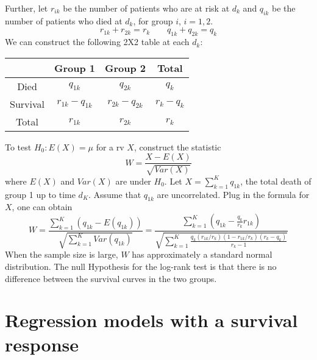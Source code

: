 \documentclass[
  letterpaper,
  DIV=11,
  numbers=noendperiod]{scrreprt}
\begin{document}
Further, let \(r_{ik}\) be the number of patients who are at risk at
\(d_k\) and \(q_{ik}\) be the number of patients who died at \(d_k\),
for group \(i\), \(i=1,2\).
\[r_{1k}+r_{2k} =r_k \qquad q_{1k}+q_{2k}=q_k \] We can construct the
following 2X2 table at each \(d_k\):

\begin{longtable}[]{@{}cccc@{}}
\toprule\noalign{}
& Group 1 & Group 2 & Total \\
\midrule\noalign{}
\endhead
\bottomrule\noalign{}
\endlastfoot
Died & \(q_{1k}\) & \(q_{2k}\) & \(q_k\) \\
Survival & \(r_{1k}-q_{1k}\) & \(r_{2k} -q_{2k}\) & \(r_k-q_k\) \\
Total & \(r_{1k}\) & \(r_{2k}\) & \(r_k\) \\
\end{longtable}

To test \(H_0: E(X)=\mu\) for a rv \(X\), construct the statistic \[ 
W = \frac{X-E(X)}{\sqrt{Var(X)}}
\] where \(E(X)\) and \(Var(X)\) are under \(H_0\). Let
\(X=\sum_{k=1}^K q_{1k}\), the total death of group 1 up to time
\(d_K\). Assume that \(q_{1k}\) are uncorrelated. Plug in the formula
for \(X\), one can obtain \[
W=\frac{\sum_{k=1}^K(q_{1k}-E(q_{1k}))}{\sqrt{\sum_{k=1}^K Var(q_{1k})}} = \frac{\sum_{k=1}^K(q_{1k}- \frac{q_k}{r_k}r_{1k})}{\sqrt{\sum_{k=1}^K \frac{q_k(r_{1k}/r_k)(1-r_{1k}/r_k)(r_k-q_k)}{r_k - 1}  } }
\] When the sample size is large, \(W\) has approximately a standard
normal distribution. The null Hypothesis for the log-rank test is that
there is no difference between the survival curves in the two groups.

\section{Regression models with a survival
response}\label{regression-models-with-a-survival-response}
\end{document}
